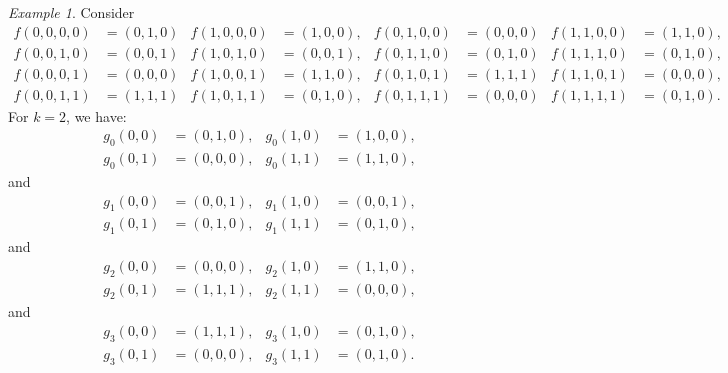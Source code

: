 \documentclass[12pt]{amsart}
\theoremstyle{plain}
\theoremstyle{definition}
\theoremstyle{remark}
\newtheorem{example}[theorem]{Example}
\begin{document}
\begin{example}
  Consider
  \begin{align*}
    f(0,0,0,0) &= (0,1,0) & f(1, 0, 0, 0) &= (1, 0, 0), & f(0,1,0,0) &= (0,0,0) & f(1, 1, 0, 0) &= (1,1,0), \\
    f(0,0,1,0) &= (0,0,1) & f(1, 0, 1, 0) &= (0, 0, 1), & f(0,1,1,0) &= (0,1,0) & f(1, 1, 1, 0) &= (0,1,0), \\
    f(0,0,0,1) &= (0,0,0) & f(1, 0, 0, 1) &= (1, 1, 0), & f(0,1,0,1) &= (1,1,1) & f(1, 1, 0, 1) &= (0,0,0), \\
    f(0,0,1,1) &= (1,1,1) & f(1, 0, 1, 1) &= (0, 1, 0), & f(0,1,1,1) &= (0,0,0) & f(1, 1, 1, 1) &= (0,1,0).
  \end{align*}
  For $k=2$, we have:
  \begin{align*}
    g_0(0, 0) &= (0,1,0), & g_0(1,0) &= (1, 0, 0), \\
    g_0(0, 1) &= (0,0,0), & g_0(1,1) &= (1, 1, 0),
  \end{align*}
  and
  \begin{align*}
    g_1(0, 0) &= (0,0,1), & g_1(1,0) &= (0, 0, 1), \\
    g_1(0, 1) &= (0,1,0), & g_1(1,1) &= (0, 1, 0),
  \end{align*}
  and
  \begin{align*}
    g_2(0, 0) &= (0,0,0), & g_2(1,0) &= (1, 1, 0), \\
    g_2(0, 1) &= (1,1,1), & g_2(1,1) &= (0, 0, 0),
  \end{align*}
  and
  \begin{align*}
    g_3(0, 0) &= (1,1,1), & g_3(1,0) &= (0, 1, 0), \\
    g_3(0, 1) &= (0,0,0), & g_3(1,1) &= (0, 1, 0).
  \end{align*}


\end{example}
\end{document}
